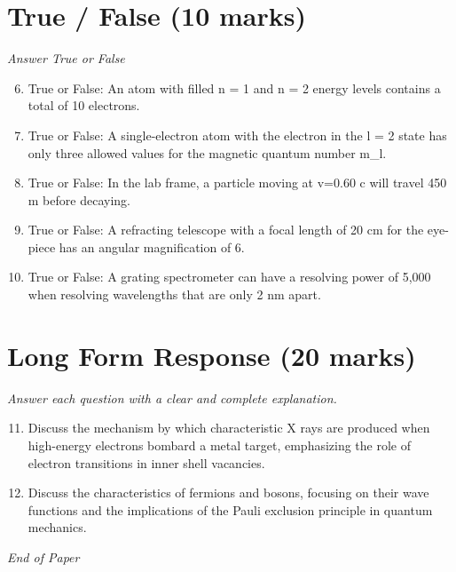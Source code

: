 \documentclass[12pt]{article}
\begin{document}
\section*{True / False (10 marks)}
\textit{Answer True or False}
\begin{enumerate}[label=\arabic*.]
\setcounter{enumi}{5}
\item True or False: An atom with filled n = 1 and n = 2 energy levels contains a total of 10 electrons.
\item True or False: A single-electron atom with the electron in the l = 2 state has only three allowed values for the magnetic quantum number m\_l.
\item True or False: In the lab frame, a particle moving at v=0.60 c will travel 450 m before decaying.
\item True or False: A refracting telescope with a focal length of 20 cm for the eye-piece has an angular magnification of 6.
\item True or False: A grating spectrometer can have a resolving power of 5,000 when resolving wavelengths that are only 2 nm apart.
\end{enumerate}

\section*{Long Form Response (20 marks)}
\textit{Answer each question with a clear and complete explanation.}
\begin{enumerate}[label=\arabic*.]
\setcounter{enumi}{10}
\item Discuss the mechanism by which characteristic X rays are produced when high-energy electrons bombard a metal target, emphasizing the role of electron transitions in inner shell vacancies.
\item Discuss the characteristics of fermions and bosons, focusing on their wave functions and the implications of the Pauli exclusion principle in quantum mechanics.
\end{enumerate}

\vfill
\noindent\textit{End of Paper}
\end{document}
